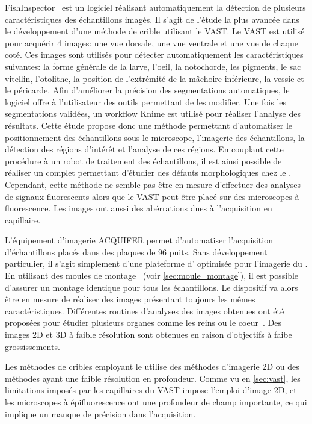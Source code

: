 \documentclass[\main/main.tex]{subfiles}
\begin{document}
FishInspector~\cite{teixid_2019} est un logiciel réalisant automatiquement la détection de plusieurs caractéristiques des échantillons imagés.
%
Il s'agit de l'étude la plus avancée dans le développement d'une méthode de crible utilisant le VAST.
%
Le VAST est utilisé pour acquérir 4 images: une vue dorsale, une vue ventrale et une vue de chaque coté.
%
Ces images sont utilisés pour détecter automatiquement les caractéristiques suivantes:
%
la forme générale de la larve,
l'oeil,
la notochorde,
les pigments,
le sac vitellin,
l'otolithe,
la position de l'extrémité de la mâchoire inférieure,
la vessie et le péricarde.
%
Afin d'améliorer la précision des segmentations automatiques,
le logiciel offre à l'utilisateur des outils permettant de les modifier.
%
Une fois les segmentations validées, un workflow Knime est utilisé pour réaliser l'analyse des résultats.
%
Cette étude propose donc une méthode permettant d'automatiser le positionnement des échantillons sous le microscope, l'imagerie des échantillons, la détection des régions d'intérêt et l'analyse de ces régions.
%
En couplant cette procédure à un robot de traitement des échantillons, il est ainsi possible de réaliser un \hcs{} complet permettant d'étudier des défauts morphologiques chez le \pz{}.
%
Cependant, cette méthode ne semble pas être en mesure d'effectuer des analyses de signaux fluorescents alors que le VAST peut être placé sur des microscopes à fluorescence. Les images ont aussi des abérrations dues à l'acquisition en capillaire.

%
L'équipement d'imagerie ACQUIFER permet d'automatiser l'acquisition d'échantillons placés dans des plaques de 96 puits.
%
Sans développement particulier, il s'agit simplement d'une plateforme d'\hti{} optimisée pour l'imagerie du \pz{}.
%
En utilisant des moules de montage~\cite{wittbrodt_2014} (voir \autoref{sec:moule_montage}), il est possible d'assurer un montage identique pour tous les échantillons.
%
Le dispositif va alors être en mesure de réaliser des images présentant toujours les mêmes caractéristiques.
%
Différentes routines d'analyses des images obtenues ont été proposées pour étudier plusieurs organes comme les reins ou le coeur~\cite{westhoff_2020, steenbergen_2020, pandey_2019}. Des images 2D et 3D à faible résolution sont obtenues en raison d'objectifs à faibe grossissements.

%
Les méthodes de cribles employant le \pz{} utilise des méthodes d'imagerie 2D ou des méthodes ayant une faible résolution en profondeur.
%
Comme vu en \autoref{sec:vast}, les limitations imposés par les capillaires du VAST impose l'emploi d'image 2D, et les microscopes à épifluorescence ont une profondeur de champ importante, ce qui implique un manque de précision dans l'acquisition.
\end{document}
